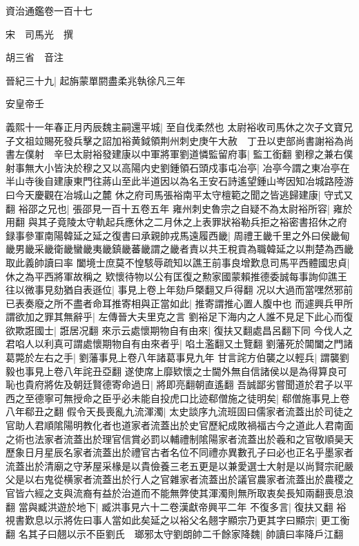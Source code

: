 資治通鑑卷一百十七

宋　司馬光　撰

胡三省　音注

晉紀三十九|{
	起旃蒙單閼盡柔兆執徐凡三年}


安皇帝壬

義熙十一年春正月丙辰魏主嗣還平城|{
	至自伐柔然也}
太尉裕收司馬休之次子文寶兄子文祖竝賜死發兵擊之詔加裕黄鉞領荆州刺史庚午大赦　丁丑以吏部尚書謝裕為尚書左僕射　辛巳太尉裕發建康以中軍將軍劉道憐監留府事|{
	監工銜翻}
劉穆之兼右僕射事無大小皆決於穆之又以高陽内史劉鍾領石頭戍事屯冶亭|{
	冶亭今謂之東冶亭在半山寺後自建康東門往蔣山至此半道因以為名王安石詩遙望鍾山岑因知冶城路陸游曰今天慶觀在冶城山之麓}
休之府司馬張裕南平太守檀範之聞之皆逃歸建康|{
	守式又翻}
裕邵之兄也|{
	張邵見一百十五卷五年}
雍州刺史魯宗之自疑不為太尉裕所容|{
	雍於用翻}
與其子竟陵太守軌起兵應休之二月休之上表罪狀裕勒兵拒之裕密書招休之府録事參軍南陽韓延之延之復書曰承親帥戎馬遠履西畿|{
	周禮王畿千里之外曰侯畿甸畿男畿采畿衛畿蠻畿夷畿鎮畿蕃畿謂之畿者責以共王稅貢為職韓延之以荆楚為西畿取此義帥讀曰率}
闔境士庶莫不惶駭辱疏知以譙王前事良增歎息司馬平西體國忠貞|{
	休之為平西將軍故稱之}
欵懷待物以公有匡復之勲家國蒙賴推德委誠每事詢仰譙王往以微事見劾猶自表遜位|{
	事見上卷上年劾戶槩翻又戶得翻}
况以大過而當嘿然邪前已表奏廢之所不盡者命耳推寄相與正當如此|{
	推寄謂推心置人腹中也}
而遽興兵甲所謂欲加之罪其無辭乎|{
	左傳晉大夫里克之言}
劉裕足下海内之人誰不見足下此心而復欲欺誑國士|{
	誑居况翻}
來示云處懷期物自有由來|{
	復扶又翻處昌呂翻下同}
今伐人之君啗人以利真可謂處懷期物自有由來者乎|{
	啗土濫翻又土覽翻}
劉藩死於閶闔之門諸葛斃於左右之手|{
	劉藩事見上卷八年諸葛事見九年}
甘言詫方伯襲之以輕兵|{
	謂襲劉毅也事見上卷八年詫丑亞翻}
遂使席上靡欵懷之士閫外無自信諸侯以是為得算良可恥也貴府將佐及朝廷賢德寄命過日|{
	將即亮翻朝直遙翻}
吾誠鄙劣嘗聞道於君子以平西之至德寧可無授命之臣乎必未能自投虎口比迹郗僧施之徒明矣|{
	郗僧施事見上卷八年郗丑之翻}
假令天長喪亂九流渾濁|{
	太史談序九流班固曰儒家者流蓋出於司徒之官助人君順隂陽明教化者也道家者流蓋出於史官歷紀成敗禍福古今之道此人君南面之術也法家者流蓋出於理官信賞必罰以輔禮制隂陽家者流蓋出於羲和之官敬順昊天歷象日月星辰名家者流蓋出於禮官古者名位不同禮亦異數孔子曰必也正名乎墨家者流蓋出於清廟之守茅屋采椽是以貴儉養三老五更是以兼愛選士大射是以尚賢宗祀嚴父是以右鬼從横家者流蓋出於行人之官雜家者流蓋出於議官農家者流蓋出於農稷之官皆六經之支與流裔有益於治道而不能無弊使其渾濁則無所取衷矣長知兩翻喪息浪翻}
當與臧洪遊於地下|{
	臧洪事見六十二卷漢獻帝興平二年}
不復多言|{
	復扶又翻}
裕視書歎息以示將佐曰事人當如此矣延之以裕父名翹字顯宗乃更其字曰顯宗|{
	更工衡翻}
名其子曰翹以示不臣劉氏　瑯邪太守劉朗帥二千餘家降魏|{
	帥讀曰率降戶江翻}
